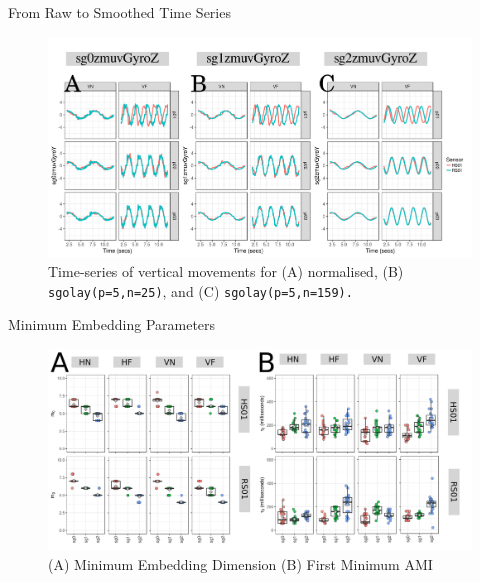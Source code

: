 {
\begin{frame}{From Raw to Smoothed Time Series}
   \begin{figure}
        \includegraphics[width=0.9\linewidth]{./figs/results/ch6-ts-v/versions/drawing-v00}{}
	\caption{Time-series of vertical movements for 
	(A) normalised, (B) \texttt{sgolay(p=5,n=25)}, and 
	(C) \texttt{sgolay(p=5,n=159).} } 
   \end{figure}
\end{frame}
}



{
\begin{frame}{Minimum Embedding Parameters}
    \begin{figure}
        \includegraphics[width=0.9\linewidth]{./figs/results/ch6-empa/versions/drawing-v00}{}
	\caption{(A) Minimum Embedding Dimension 
		 (B) First Minimum AMI
		}  
   \end{figure}
	
\end{frame}
}


